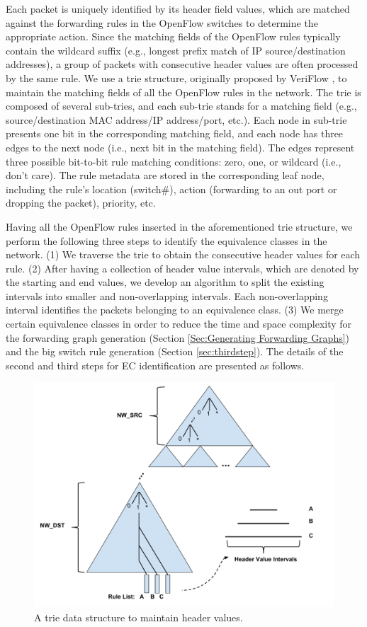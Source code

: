 Each packet is uniquely identified by its header field values, which are matched against the forwarding rules in the OpenFlow switches to determine the appropriate action. Since the matching fields of the OpenFlow rules typically contain the wildcard suffix (e.g., longest prefix match of IP source/destination addresses), a group of packets with consecutive header values are often processed by the same rule. We use a trie structure, originally proposed by VeriFlow \cite{Veriflow}, to maintain the matching fields of all the OpenFlow rules in the network. The trie is composed of several sub-tries, and each sub-trie stands for a matching field (e.g., source/destination MAC address/IP address/port, etc.). Each node in sub-trie presents one bit in the corresponding matching field, and each node has three edges to the next node (i.e., next bit in the  matching field). The edges represent three possible bit-to-bit rule matching conditions: zero, one, or wildcard (i.e., don't care). The rule metadata are stored in the corresponding leaf node, including the rule's location (switch\#), action (forwarding to an out port or dropping the packet), priority, etc.

Having all the OpenFlow rules inserted in the aforementioned trie structure, we perform the following three steps to identify the equivalence classes in the network. (1) We traverse the trie to obtain the consecutive header values for each rule. (2) After having a collection of header value intervals, which are denoted by the starting and end values, we develop an algorithm to split the existing intervals into smaller and non-overlapping intervals. Each non-overlapping interval identifies the packets belonging to an equivalence class. (3) We merge certain equivalence classes in order to reduce the time and space complexity for the forwarding graph generation (Section \ref{Sec:Generating Forwarding Graphs}) and the big switch rule generation (Section \ref{sec:thirdstep}). The details of the second and third steps for EC identification are presented as follows.

\begin{figure}[t]
\centering
\includegraphics[scale=.35]{figures/trie.pdf}
\caption{A trie data structure to maintain header values.}
\label{Fig:Trie}
\end{figure}
\fi

